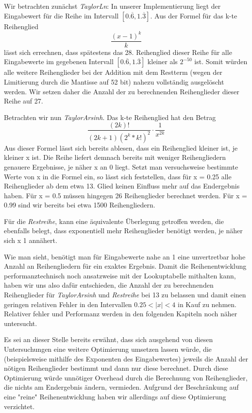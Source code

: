 \documentclass[course=erap] {aspdoc}
\begin{document}
    
    Wir betrachten zunächst \textit{TaylorLn}:
    In unserer Implementierung liegt der Eingabewert für die Reihe im Intervall $[0.\overline{6}, 1.\overline{3}]$. Aus der Formel für das k-te Reihenglied 
    \[ \frac{(x - 1)^k}{k}
    \]
    lässt sich errechnen, dass spätestens das 28. Reihenglied dieser Reihe für alle Eingabewerte im gegebenen Intervall $[0.\overline{6}, 1.\overline{3}]$ kleiner als $2^{-50}$ ist. Somit würden alle weitere Reihenglieder bei der Addition mit dem Restterm (wegen der Limitierung durch die Mantisse auf 52 bit) nahezu vollständig ausgelöscht werden. Wir setzen daher die Anzahl der zu berechnenden Reihenglieder dieser Reihe auf 27.  
    
    Betrachten wir nun \textit{TaylorArsinh}. Das k-te Reihenglied hat den Betrag
    \[
    \frac{(2k)!}{(2k + 1)(2^k*k!)^2}\cdot \frac{1}{x^{2k}}
    \]
    Aus dieser Formel lässt sich bereits ablesen, dass ein Reihenglied kleiner ist, je kleiner x ist. Die Reihe liefert demnach bereits mit weniger Reihengliedern genauere Ergebnisse, je näher x an 0 liegt. Setzt man versuchsweise bestimmte Werte von x in die Formel ein, so lässt sich feststellen, dass für x = 0.25 alle Reihenglieder ab dem etwa 13. Glied keinen Einfluss mehr auf das Endergebnis haben. Für x = 0.5 müssen hingegen 26 Reihenglieder berechnet werden. Für x = 0.99 sind wir bereits bei etwa 1500 Reihengliedern. 
    
    Für die \textit{Restreihe}, kann eine äquivalente Überlegung getroffen werden, die ebenfalls belegt, dass exponentiell mehr Reihenglieder benötigt werden, je näher sich x 1 annähert.
    
    
    Wie man sieht, benötigt man für Eingabewerte nahe an 1 eine unvertretbar hohe Anzahl an Reihengliedern für ein exaktes Ergebnis. Damit die Reihenentwicklung performanztechnisch noch ansatzweise mit der Lookuptabelle mithalten kann, haben wir uns also dafür entschieden, die Anzahl der zu berechnenden Reihenglieder für \textit{TaylorArsinh} und \textit{Restreihe} bei 13 zu belassen und damit einen geringen relativen Fehler in den Intervallen $0.25<|x|<4$ in Kauf zu nehmen. 
    Relativer fehler und Performanz werden in den folgenden Kapiteln noch näher untersucht.
    
    Es sei an dieser Stelle bereits erwähnt, dass sich ausgehend von diesen Untersuchungen eine weitere Optimierung umsetzen lassen würde, die (beispielsweise mithilfe des Exponenten des Eingabewertes) jeweils die Anzahl der nötigen Reihenglieder bestimmt und dann nur diese berechnet. Durch diese Optimierung würde unnötiger Overhead durch die Berechnung von Reihenglieder, die nichts am Endergebnis ändern, vermieden. Aufgrund der Beschränkung auf eine "reine" Reihenentwicklung haben wir allerdings auf diese Optimierung verzichtet. 
\end{document}
